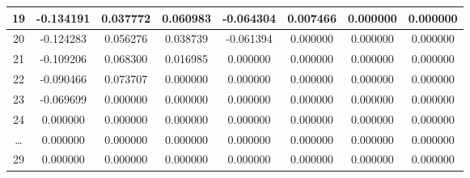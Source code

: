 \documentclass{article}
\begin{document}
\begin{table}[h!]
\begin{tabular}{|c|c|c|c|c|c|c|c|}
\hline
19&-0.134191&0.037772&0.060983&-0.064304&0.007466&0.000000&0.000000 \\ 
\hline
20&-0.124283&0.056276&0.038739&-0.061394&0.000000&0.000000&0.000000 \\ 
\hline
21&-0.109206&0.068300&0.016985&0.000000&0.000000&0.000000&0.000000 \\ 
\hline
22&-0.090466&0.073707&0.000000&0.000000&0.000000&0.000000&0.000000 \\ 
\hline
23&-0.069699&0.000000&0.000000&0.000000&0.000000&0.000000&0.000000 \\ 
\hline
24&0.000000&0.000000&0.000000&0.000000&0.000000&0.000000&0.000000 \\ 
\hline
\dots&0.000000&0.000000&0.000000&0.000000&0.000000&0.000000&0.000000 \\ 
\hline
29&0.000000&0.000000&0.000000&0.000000&0.000000&0.000000&0.000000 \\ 
\hline
\end{tabular}
\end{table}
\end{document}
